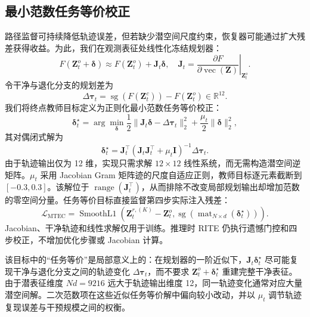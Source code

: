 \documentclass[letterpaper,10pt,conference]{ieeeconf}
\newcommand{\sg}{\operatorname{sg}}
\begin{document}
\subsection{最小范数任务等价校正}

路径监督可持续降低轨迹误差，但若缺少潜空间尺度约束，恢复器可能通过扩大残差获得收益。为此，我们在观测表征处线性化冻结规划器：
\begin{equation}
F(\mathbf Z_t^o+\boldsymbol\delta)\approx
F(\mathbf Z_t^o)+\mathbf J_t\boldsymbol\delta,\quad
\mathbf J_t=\left.\frac{\partial F}{\partial\operatorname{vec}(\mathbf Z)}
\right|_{\mathbf Z_t^o}.
\label{eq:jacobian}
\end{equation}
令干净与退化分支的规划差为
\begin{equation}
\Delta\boldsymbol\tau_t=
\sg(F(\mathbf Z_t^c))-F(\mathbf Z_t^o)\in\mathbb R^{12}.
\label{eq:trajectory_delta}
\end{equation}
我们将终点教师目标定义为正则化最小范数任务等价校正：
\begin{equation}
\boldsymbol\delta_t^\star=\arg\min_{\boldsymbol\delta}
\frac{1}{2}\|\mathbf J_t\boldsymbol\delta-
\Delta\boldsymbol\tau_t\|_2^2+
\frac{\mu_t}{2}\|\boldsymbol\delta\|_2^2,
\label{eq:minimum_norm}
\end{equation}
其对偶闭式解为
\begin{equation}
\boldsymbol\delta_t^\star=\mathbf J_t^\top
(\mathbf J_t\mathbf J_t^\top+\mu_t\mathbf I)^{-1}
\Delta\boldsymbol\tau_t.
\label{eq:dual_solution}
\end{equation}
由于轨迹输出仅为 12 维，实现只需求解 $12\times12$ 线性系统，而无需构造潜空间逆矩阵。$\mu_t$ 采用 Jacobian Gram 矩阵迹的尺度自适应正则，教师目标逐元素截断到 $[-0.3,0.3]$。该解位于 $\operatorname{range}(\mathbf J_t^\top)$，从而排除不改变局部规划输出却增加范数的零空间分量。任务等价目标直接监督第四步实际注入残差：
\begin{equation}
\mathcal L_{\mathrm{MTEC}}=\operatorname{SmoothL1}
(\mathbf Z_t^{r,(K)}-\mathbf Z_t^o,
\sg(\operatorname{mat}_{N\times d}(\boldsymbol\delta_t^\star))).
\label{eq:jacobian_loss}
\end{equation}
Jacobian、干净轨迹和线性求解仅用于训练。推理时 RITE 仍执行遗憾门控和四步校正，不增加优化步骤或 Jacobian 计算。

该目标中的“任务等价”是局部意义上的：在规划器的一阶近似下，$\mathbf J_t\boldsymbol\delta_t^\star$ 尽可能复现干净与退化分支之间的轨迹变化 $\Delta\boldsymbol\tau_t$，而不要求 $\mathbf Z_t^o+\boldsymbol\delta_t^\star$ 重建完整干净表征。由于潜表征维度 $Nd=9216$ 远大于轨迹输出维度 12，同一轨迹变化通常对应大量潜空间解。二次范数项在这些近似任务等价解中偏向较小改动，并以 $\mu_t$ 调节轨迹复现误差与干预规模之间的权衡。
\end{document}
